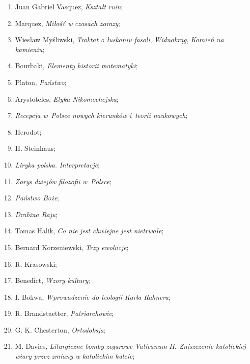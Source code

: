 \documentclass[a4paper,11pt]{article}
\begin{document}
\begin{enumerate}
\item Juan Gabriel Vasquez, \textit{Kształt ruin};

\item Marquez, \textit{Miłość w czasach zarazy};

\item Wiesław Myśliwski, \textit{Traktat o łuskaniu fasoli},
  \textit{Widnokrąg}, \textit{Kamień na kamieniu};

\item Bourbaki, \textit{Elementy historii matematyki};

\item Platon, \textit{Państwo};

\item Arystoteles, \textit{Etyka Nikomochejska};

\item \textit{Recepcja w~Polsce nowych kierunków i~teorii naukowych};

\item Herodot;

\item H. Steinhaus;

\item \textit{Liryka polska. Interpretacje};

\item \textit{Zarys dziejów filozofii w~Polsce};

\item \textit{Państwo Boże};

\item \textit{Drabina Raju};

\item Tomas Halik, \textit{Co nie jest chwiejne jest nietrwałe};

\item Bernard Korzeniewski, \textit{Trzy ewolucje};

\item R. Krasowski;

\item Benedict, \textit{Wzory kultury};

\item I. Bokwa, \textit{Wprowadzenie do teologii Karla Rahnera};

\item R. Brandstaetter, \textit{Patriarchowie};

\item G. K. Chesterton, \textit{Ortodoksja};

\item M. Davies, \textit{Liturgiczne bomby zegarowe Vaticanum II.
    Zniszczenie katolickiej wiary przez zmiany w katolickim kulcie};


\end{enumerate}
\end{document}
